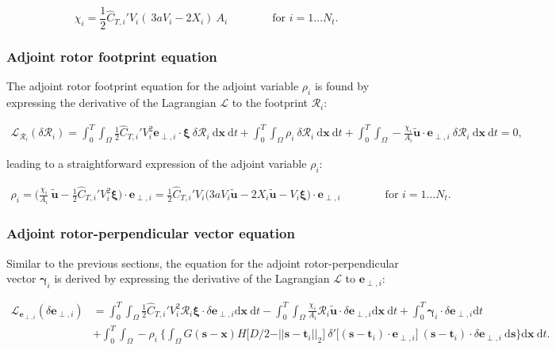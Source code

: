 \documentclass[energies,article,submit,moreauthors,latex,10pt,a4paper]{mdpi}
\newcommand{\ds}{~\text{d}\boldsymbol{s}}
\newcommand{\bs}[1]{\boldsymbol{#1}}
\newcommand{\dx}{\text{d}\boldsymbol{x}}
\newcommand{\dt}{\text{d}t}
\newcommand{\stint}{\int_{0}^{T} \int_{\Omega}}
\newcommand{\sint}{\int_{\Omega}}
\newcommand{\Tint}{\int_{0}^{T}}
\newcommand{\utilde}{\widetilde{\bs{u}}}
\newcommand{\ctihat}{\widehat{C}_{T,i}'}
\newcommand{\R}{\mathscr{R}}
\newcommand{\Lagr}{\mathscr{L}}
\newcommand{\eperpi}{\bs{e}_{\perp,i}}
\newcommand{\diracdelta}{{\delta}}
\begin{document}
\begin{equation}\label{eq:chi_i}
\chi_i = \frac{1}{2} \ctihat V_i (~3a V_i - 2 X_i )~A_i \qquad\qquad \text{for } i=1\dots N_t. 
\end{equation}

\subsubsection{Adjoint rotor footprint equation}
\noindent The adjoint rotor footprint equation for the adjoint variable $\rho_i$ is found by expressing the derivative of the Lagrangian $\Lagr$ to the footprint $\R_i$: 

\begin{align}
\Lagr_{\R_i}(\delta \R_i) = \stint \frac{1}{2} \ctihat V_i^2 \eperpi \cdot \bs{\xi} ~\delta \R_i ~\dx ~ \dt + \stint \rho_i ~\delta \R_i ~\dx ~\dt + \stint -\frac{\chi_i}{A_i} \utilde \cdot \eperpi ~\delta \R_i ~\dx ~\dt = 0,
\end{align}    

\noindent leading to a straightforward expression of the adjoint variable $\rho_i$:

\begin{align}
\rho_i = \bigg( \frac{\chi_i}{A_i}~\utilde - \frac{1}{2} \ctihat V_i^2 \bs{\xi} \bigg) \cdot \eperpi = \frac{1}{2} \ctihat V_i \bigg(3aV_i \utilde  -2 X_i \utilde - V_i\bs{\xi} \bigg) \cdot \eperpi \qquad\qquad \text{for } i=1\dots N_t. \label{eq:rho_i}
\end{align}

\subsubsection{Adjoint rotor-perpendicular vector equation}
\noindent Similar to the previous sections, the equation for the adjoint rotor-perpendicular vector $\bs{\gamma}_i$ is derived by expressing the derivative of the Lagrangian $\Lagr$ to $\eperpi$:

\begin{align}
\Lagr_{\eperpi}(\delta \eperpi) &= \stint \frac{1}{2} \ctihat V_i^2 \R_i \bs{\xi} \cdot \delta \eperpi \dx ~ \dt - \stint \frac{\chi_i}{A_i} \R_i \utilde \cdot \delta \eperpi \dx~ \dt + \Tint \bs{\gamma}_i \cdot \delta \eperpi \dt \nonumber \\
& + \stint - \rho_i ~ \bigg\{ \sint G(\bs{s} - \bs{x})  H\big[D/2 - \vert\vert \bs{s} - \bs{t}_i \vert\vert_2 \big]~\diracdelta'\big[(\bs{s} - \bs{t}_i) \cdot \eperpi \big]~(\bs{s} - \bs{t}_i) \cdot \delta \eperpi \ds \bigg\} \dx ~\dt \label{eq:app_adj_perp1}.
\end{align}
\end{document}

